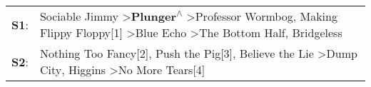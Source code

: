 \begin{supertabular}{p{0.03\textwidth}p{0.92\textwidth}}
 \textbf{S1}:  &  Sociable Jimmy\textsuperscript{} \textgreater \enspace \textbf{Plunger\textsuperscript{$\wedge$}} \textgreater \enspace Professor Wormbog\textsuperscript{}, \enspace Making Flippy Floppy[1]\textsuperscript{} \textgreater \enspace Blue Echo\textsuperscript{} \textgreater \enspace The Bottom Half\textsuperscript{}, \enspace Bridgeless\textsuperscript{}  \enspace  \\
 \textbf{S2}:  &                                                                                     Nothing Too Fancy[2]\textsuperscript{}, \enspace Push the Pig[3]\textsuperscript{}, \enspace Believe the Lie\textsuperscript{} \textgreater \enspace Dump City\textsuperscript{}, \enspace Higgins\textsuperscript{} \textgreater \enspace No More Tears[4]\textsuperscript{}  \enspace  \\
\end{supertabular}
